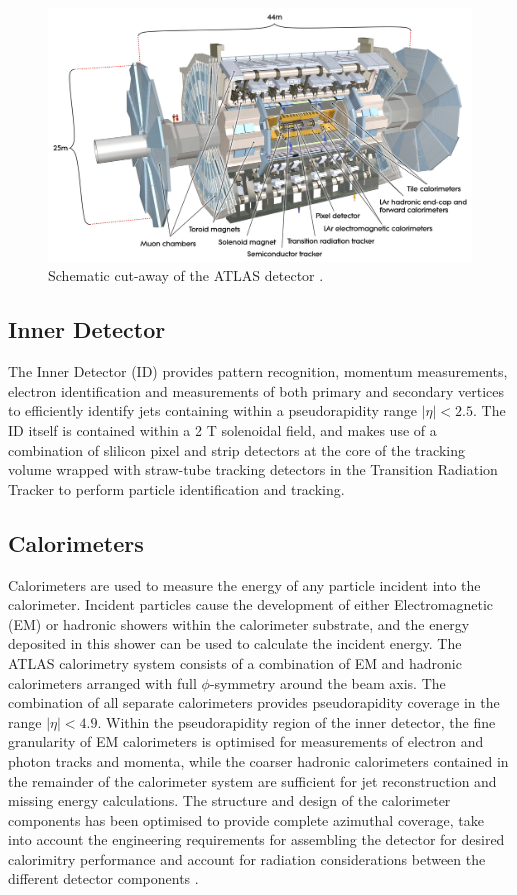 	\begin{figure}[h]
		\centering
		\includegraphics[width=0.7\linewidth]{D/FIGS/ATLAS_SE_Corrected7}
		\caption{Schematic cut-away of the ATLAS detector \cite{ATLASSchem}.}
		\label{fig:t:ATLAS}
	\end{figure}



	\subsection{Inner Detector}

		The Inner Detector (ID) provides pattern recognition, momentum measurements, electron identification and measurements of both primary and secondary vertices to efficiently identify jets containing \bhadron within a pseudorapidity range $|\eta|<2.5$. The ID itself is contained within a 2 T solenoidal field, and makes use of a combination of slilicon pixel and strip detectors at the core of the tracking volume wrapped with straw-tube tracking detectors in the Transition Radiation Tracker to perform particle identification and tracking.

	\subsection{Calorimeters}

		Calorimeters are used to measure the energy of any particle incident into the calorimeter. Incident particles cause the development of either Electromagnetic (EM) or hadronic showers within the calorimeter substrate, and the energy deposited in this shower can be used to calculate the incident energy. The ATLAS calorimetry system consists of a combination of EM and hadronic calorimeters arranged with full $\phi$-symmetry around the beam axis. The combination of all separate calorimeters provides pseudorapidity coverage in the range $|\eta| < 4.9$. Within the pseudorapidity region of the inner detector, the fine granularity of EM calorimeters is optimised for measurements of electron and photon tracks and momenta, while the coarser hadronic calorimeters contained in the remainder of the calorimeter system are sufficient for jet reconstruction and missing energy calculations. The structure and design of the calorimeter components has been optimised to provide complete azimuthal coverage, take into account the engineering requirements for assembling the detector for desired calorimitry performance and account for radiation considerations between the different detector components \cite{ATLAS}.

